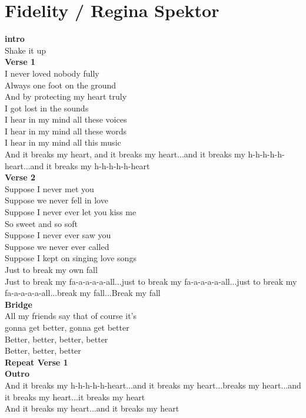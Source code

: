 \section{Fidelity / Regina Spektor}\label{ch:fidelity}
\Gmajor
\Cmajor
\Fmajor
\Aminor
\DmajorEasy

\textbf{intro}\\
Shake it up \\
\textbf{Verse 1}          \\         
I never loved nobody fully        \\
Always one foot on the ground\\
And by protecting my heart truly\\
I got lost in the sounds\\
I hear in my mind all these voices\\
I hear in my mind all these words\\
I hear in my mind all this music\\
And it breaks my heart, and it breaks my heart...and it breaks my h-h-h-h-h-heart...and it breaks my h-h-h-h-h-heart\\
\textbf{Verse 2}\\
Suppose I never met you\\
Suppose we never fell in love\\
Suppose I never ever let you kiss me\\
So sweet and so soft\\
Suppose I never ever saw you\\
Suppose we never ever called\\
Suppose I kept on singing love songs\\
Just to break my own fall\\
Just to break my fa-a-a-a-a-all...just to break my fa-a-a-a-a-all...just to break my fa-a-a-a-a-all...break my fall...Break my fall\\
\textbf{Bridge}\\
All my friends say that of course it's\\
gonna get better, gonna get better\\
Better, better, better, better\\
Better, better, better\\
\textbf{Repeat Verse 1}\\
\textbf{Outro}\\
And it breaks my h-h-h-h-h-heart...and it breaks my heart...breaks my heart...and it breaks my heart...it breaks my heart\\
And it breaks my heart...and it breaks my heart


